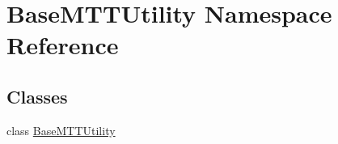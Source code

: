 \hypertarget{namespace_base_m_t_t_utility}{\section{Base\-M\-T\-T\-Utility Namespace Reference}
\label{namespace_base_m_t_t_utility}
}
\subsection*{Classes}
\begin{DoxyCompactItemize}
\item 
class \hyperlink{class_base_m_t_t_utility_1_1_base_m_t_t_utility}{Base\-M\-T\-T\-Utility}
\end{DoxyCompactItemize}
